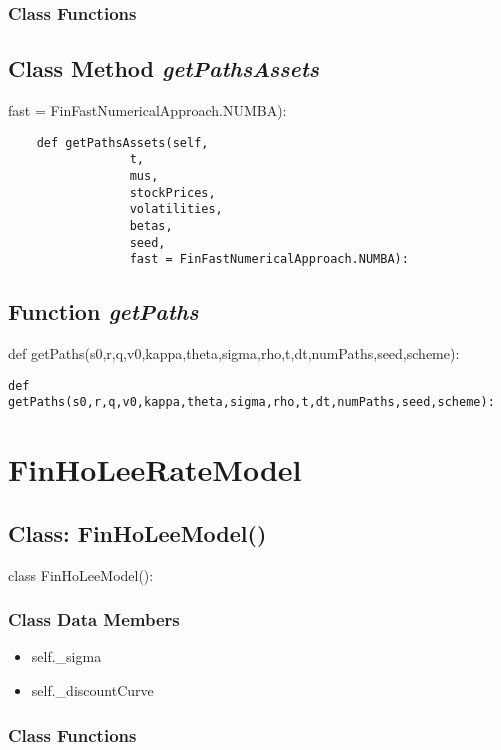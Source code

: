 \documentclass[twoside,11pt]{book}
\begin{document}
\subsubsection{Class Functions}

\subsection{Class Method {\it getPathsAssets}}
fast = FinFastNumericalApproach.NUMBA):

\begin{lstlisting}
    def getPathsAssets(self, 
                 t,
                 mus,
                 stockPrices,
                 volatilities,
                 betas,
                 seed, 
                 fast = FinFastNumericalApproach.NUMBA):
\end{lstlisting}

\subsection{Function {\it getPaths}}
def getPaths(s0,r,q,v0,kappa,theta,sigma,rho,t,dt,numPaths,seed,scheme):

\begin{lstlisting}
def getPaths(s0,r,q,v0,kappa,theta,sigma,rho,t,dt,numPaths,seed,scheme):
\end{lstlisting}

\newpage
\section{FinHoLeeRateModel}

\subsection{Class: FinHoLeeModel()}
class FinHoLeeModel():

\subsubsection{Class Data Members}
\begin{itemize}
\item{self.\_sigma}
\item{self.\_discountCurve}
\end{itemize}

\subsubsection{Class Functions}
\end{document}
